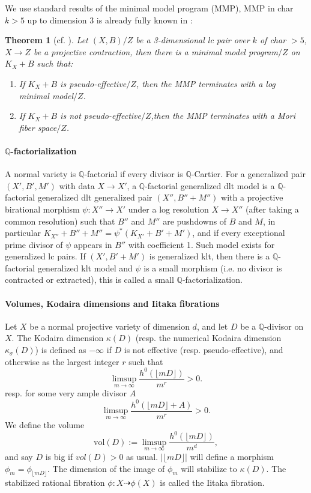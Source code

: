 \documentclass[letterpaper,reqno,12pt]{amsart}
\newcommand{\tbf}{\textbf}
\numberwithin{equation}{section}
\theoremstyle{plain}
\newtheorem{theorem}{Theorem}[section]
\begin{document}
We use standard results of the minimal model program (MMP), MMP in char $k>5$ up to dimension 3 is already fully known in \cite[1.1]{KYH20lcmmp}:
\begin{theorem}[cf. \cite{KYH20lcmmp}]
    Let $(X,B)/Z$ be a 3-dimensional lc pair over $k$ of char $>5$, $X\to Z$ be a projective contraction, then there is a minimal model program$/Z$ on $K_X+B$ such that:
    \begin{enumerate}
        \item If $K_X+B$ is pseudo-effective$/Z$, then the MMP terminates with a log minimal model$/Z$.
        \item If $K_X+B$ is not pseudo-effective$/Z$,then the MMP terminates with a Mori fiber space$/Z$.
    \end{enumerate}
\end{theorem}

\paragraph{\tbf{$\mathbb Q$-factorialization}}
A normal variety is $\mathbb Q$-factorial if every divisor is $\mathbb Q$-Cartier. For a generalized pair $(X',B',M')$ with data $X\to X'$, a $\mathbb Q$-factorial generalized dlt model is a $\mathbb Q$-factorial generalized dlt generalized pair $(X'',B''+M'')$ with a projective birational morphism $\psi:X''\to X'$ under a log resolution $X\to X''$ (after taking a common resolution) such that $B''$ and $M''$ are pushdowns of $B$ and $M$, in particular $K_{X''}+B''+M''=\psi^*(K_{X'}+B'+M')$, and if every exceptional prime divisor of $\psi$ appears in $B''$ with coefficient 1. Such model exists for generalized lc pairs. If $(X',B'+M')$ is generalized klt, then there is a $\mathbb Q$-factorial generalized klt model and $\psi$ is a small morphism (i.e. no divisor is contracted or extracted), this is called a small $\mathbb Q$-factorialization.

\paragraph{\tbf{Volumes, Kodaira dimensions and Iitaka fibrations}}
Let $X$ be a normal projective variety of dimension $d$, and let $D$ be a $\mathbb Q$-divisor on $X$. The Kodaira dimension $\kappa(D)$ (resp. the numerical Kodaira dimension $\kappa_\sigma(D)$) is defined as $-\infty$ if $D$ is not effective (resp. pseudo-effective), and otherwise as the largest integer $r$ such that \[\limsup_{m\to\infty}\frac{h^0(\lfloor mD\rfloor)}{m^r}>0.\] resp. for some very ample divisor $A$\[\limsup_{m\to\infty}\frac{h^0(\lfloor mD\rfloor+A)}{m^r}>0.\] We define the volume \[\text{vol}(D):=\limsup_{m\to \infty}\frac{h^0(\lfloor mD\rfloor)}{m^d},\] and say $D$ is big if $vol(D)>0$ as usual. $|\lfloor mD\rfloor|$ will define a morphism $\phi_m=\phi_{\lfloor mD\rfloor}$. The dimension of the image of $\phi_m$ will stabilize to $\kappa(D)$. The stabilized rational fibration $\phi:X\dashrightarrow \phi(X)$ is called the Iitaka fibration.
\end{document}
